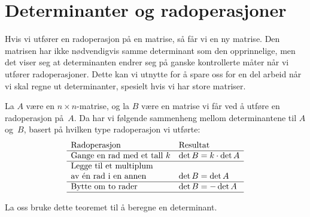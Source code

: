 \section*{Determinanter og radoperasjoner}

Hvis vi utfører en radoperasjon på en matrise, så får vi en ny
matrise.  Den matrisen har ikke nødvendigvis samme determinant som den
opprinnelige, men det viser seg at determinanten endrer seg på ganske
kontrollerte måter når vi utfører radoperasjoner.  Dette kan vi
utnytte for å spare oss for en del arbeid når vi skal regne ut
determinanter, spesielt hvis vi har store matriser.

\begin{thm}
\label{thm:det-radop}
La $A$ være en $n \times n$-matrise, og la $B$ være en matrise vi får
ved å utføre en radoperasjon på~$A$.  Da har vi følgende sammenheng
mellom determinantene til $A$ og~$B$, basert på hvilken type
radoperasjon vi utførte:
\\
\[
\begin{array}{ll}
\text{Radoperasjon} & \text{Resultat} \\\hline
\textup{Gange en rad med et tall~$k$} &
\det B = k \cdot \det A \\\hline
\textup{Legge til et multiplum}\\\textup{av én rad i en annen} &
\det B = \det A \\\hline
\textup{Bytte om to rader} &
\det B = - \det A \\\hline
\end{array}
\]
\end{thm}

La oss bruke dette teoremet til å beregne en determinant.

